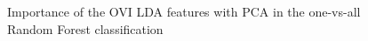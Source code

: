 \documentclass[twoside]{article}
\begin{document}
\begin{multicols}{2}
\begin{figure}[H]
\centering
{}
\quad
{}
\quad
{}
%
\caption{Importance of the OVI LDA features with PCA in the one-vs-all Random Forest classification}
\label{fig:figure}
\end{figure}


\end{multicols}
\end{document}

